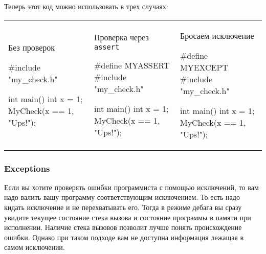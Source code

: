 Теперь этот код можно использовать в трех случаях:
\begin{center}
\begin{tabular}{lll}
{
\begin{minipage}[\baselineskip]{5cm}
Без проверок
\begin{cppcode}[numbers = none]

#include "my_check.h"

int main() {
  int x = 1;
  MyCheck(x == 1, "Ups!");
}
\end{cppcode}
\end{minipage}
}&{
\begin{minipage}[\baselineskip]{5cm}
Проверка через \verb"assert"
\begin{cppcode}[numbers = none]
#define MYASSERT
#include "my_check.h"

int main() {
  int x = 1;
  MyCheck(x == 1, "Ups!");
}
\end{cppcode}
\end{minipage}
}&{
\begin{minipage}[\baselineskip]{5cm}
Бросаем исключение
\begin{cppcode}[numbers = none]
#define MYEXCEPT
#include "my_check.h"

int main() {
  int x = 1;
  MyCheck(x == 1, "Ups!");
}
\end{cppcode}
\end{minipage}
}
\end{tabular}
\end{center}

\subsubsection{Exceptions}

Если вы хотите проверять ошибки программиста с помощью исключений, то вам надо валить вашу программу соответствующим исключением.
То есть надо кидать исключение и не перехватывать его.
Тогда в режиме дебага вы сразу увидите текущее состояние стека вызова и состояние программы в памяти при исполнении.
Наличие стека вызовов позволит лучше понять происхождение ошибки.
Однако при таком подходе вам не доступна информация лежащая в самом исключении.

